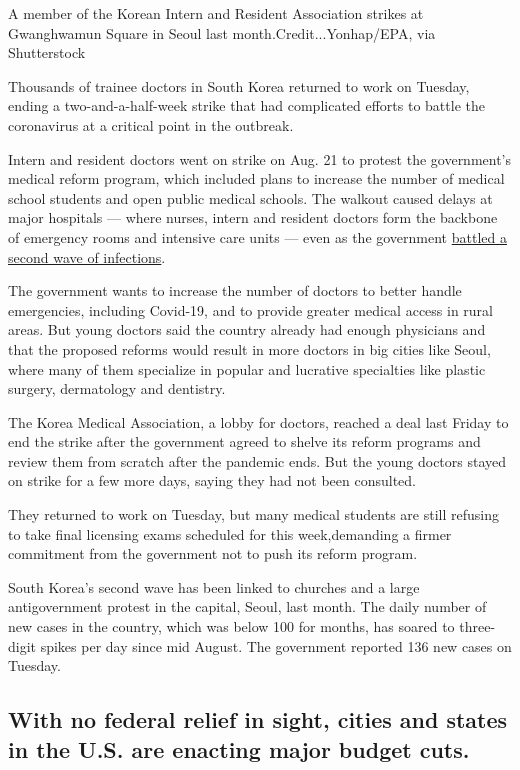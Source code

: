 A member of the Korean Intern and Resident Association strikes at
Gwanghwamun Square in Seoul last month.Credit...Yonhap/EPA, via
Shutterstock

Thousands of trainee doctors in South Korea returned to work on Tuesday,
ending a two-and-a-half-week strike that had complicated efforts to
battle the coronavirus at a critical point in the outbreak.

Intern and resident doctors went on strike on Aug. 21 to protest the
government's medical reform program, which included plans to increase
the number of medical school students and open public medical schools.
The walkout caused delays ​at major hospitals --- where nurses, intern
and resident doctors form the backbone of emergency rooms and intensive
care units​ --- even as the government
\href{https://www.nytimes3xbfgragh.onion/2020/08/20/world/asia/coronavirus-south-korea-church-sarang-jeil.html}{battled
a second wave of infections}.

The government wants to increase the number of doctors to better handle
emergencies, including Covid-19, and to provide greater medical access
in rural areas. But young doctors said the country already had enough
physicians and that the proposed reforms would result in more doctors in
big cities like Seoul, where many of them specialize in popular and
lucrative specialties like plastic surgery, dermatology and dentistry.

The Korea Medical Association, a lobby for doctors, reached a deal last
Friday to end the strike after the government agreed to shelve its
reform programs and review them from scratch after the pandemic ends.
But the young doctors stayed on strike for a few more days, saying they
had not been consulted.

They returned to work on Tuesday, but many medical students are still
refusing to take final licensing exams​ scheduled for this week,​
​demanding a firmer commitment from the government not to push its
reform program.

South Korea's second wave has been linked to churches and a large
antigovernment protest in the capital, Seoul, last month. The daily
number of new cases in the country, which was below 100 for months, has
soared to three-digit spikes​ per day since mid August. The government
reported 136 new cases​ on Tuesday.

\hypertarget{with-no-federal-relief-in-sight-cities-and-states-in-the-us-are-enacting-major-budget-cuts}{%
\subsection{With no federal relief in sight, cities and states in the
U.S. are enacting major budget
cuts.}\label{with-no-federal-relief-in-sight-cities-and-states-in-the-us-are-enacting-major-budget-cuts}}

